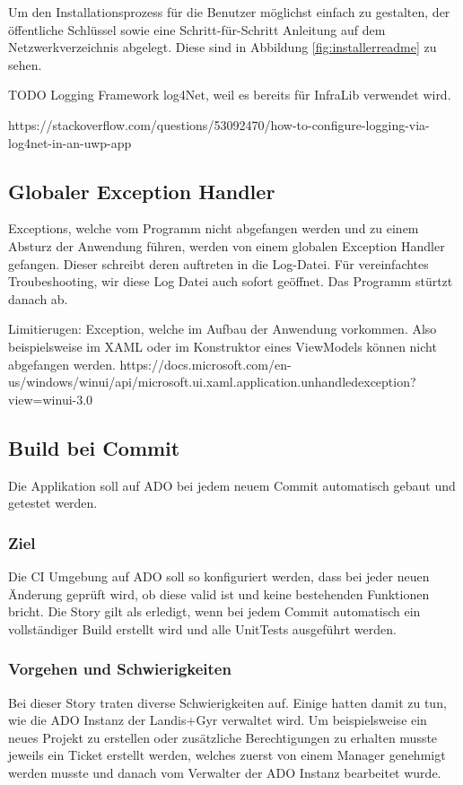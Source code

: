 Um den Installationsprozess für die Benutzer möglichst einfach zu gestalten, der öffentliche Schlüssel sowie eine Schritt-für-Schritt Anleitung auf dem Netzwerkverzeichnis abgelegt.
Diese sind in Abbildung \ref{fig:installerreadme} zu sehen.

TODO
Logging Framework
log4Net, weil es bereits für InfraLib verwendet wird. 

https://stackoverflow.com/questions/53092470/how-to-configure-logging-via-log4net-in-an-uwp-app

\subsection{Globaler Exception Handler}

Exceptions, welche vom Programm nicht abgefangen werden und zu einem Absturz der Anwendung führen, werden von einem globalen Exception Handler gefangen.
Dieser schreibt deren auftreten in die Log-Datei. Für vereinfachtes Troubeshooting, wir diese Log Datei auch sofort geöffnet. Das Programm stürtzt danach ab.

Limitierugen:
Exception, welche im Aufbau der Anwendung vorkommen. Also beispielsweise im XAML oder im Konstruktor eines ViewModels können nicht abgefangen werden.
https://docs.microsoft.com/en-us/windows/winui/api/microsoft.ui.xaml.application.unhandledexception?view=winui-3.0


\subsection{Build bei Commit}
\dq Die Applikation soll auf \ac{ADO} bei jedem neuem Commit automatisch gebaut und getestet werden.\dq

\subsubsection{Ziel}
Die \ac{CI} Umgebung auf \ac{ADO} soll so konfiguriert werden, dass bei jeder neuen Änderung geprüft wird, ob diese valid ist und keine bestehenden Funktionen bricht.
Die Story gilt als erledigt, wenn bei jedem Commit automatisch ein vollständiger Build erstellt wird und alle UnitTests ausgeführt werden.

\subsubsection{Vorgehen und Schwierigkeiten}
Bei dieser Story traten diverse Schwierigkeiten auf.
Einige hatten damit zu tun, wie die \ac{ADO} Instanz der Landis+Gyr verwaltet wird.
Um beispielsweise ein neues Projekt zu erstellen oder zusätzliche Berechtigungen zu erhalten musste jeweils ein Ticket erstellt werden, welches zuerst von einem Manager genehmigt werden musste und danach vom Verwalter der \ac{ADO} Instanz bearbeitet wurde.

